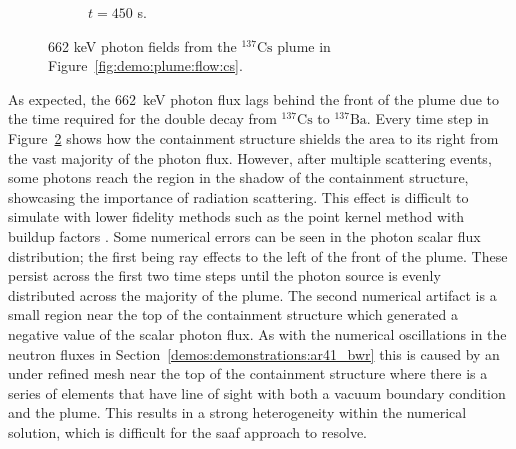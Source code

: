 \begin{figure}[H]
\begin{subfigure}[b]{0.68\textwidth}
        \caption{$t = 450$ s.}
        \label{fig:demo:plume:rad:photon:450}
    \end{subfigure}
    \caption{662 keV photon fields from the $\mathrm{^{137}Cs}$ plume in Figure~\ref{fig:demo:plume:flow:cs}.}
    \label{fig:demo:plume:rad:photon}
\end{figure}

As expected, the 662~keV photon flux lags behind the front of the plume due to the time required for the double decay from $\mathrm{^{137}Cs}$ to $\mathrm{^{137}Ba}$. Every time step in Figure~\ref{fig:demo:plume:rad:photon} shows how the containment structure shields the area to its right from the vast majority of the photon flux. However, after multiple scattering events, some photons reach the region in the shadow of the containment structure, showcasing the importance of radiation scattering. This effect is difficult to simulate with lower fidelity methods such as the point kernel method with buildup factors \cite{radiation_shielding}. Some numerical errors can be seen in the photon scalar flux distribution; the first being ray effects to the left of the front of the plume. These persist across the first two time steps until the photon source is evenly distributed across the majority of the plume. The second numerical artifact is a small region near the top of the containment structure which generated a negative value of the scalar photon flux. As with the numerical oscillations in the neutron fluxes in Section~\ref{demos:demonstrations:ar41_bwr} this is caused by an under refined mesh near the top of the containment structure where there is a series of elements that have line of sight with both a vacuum boundary condition and the plume. This results in a strong heterogeneity within the numerical solution, which is difficult for the \acrshort{saaf} approach to resolve. 